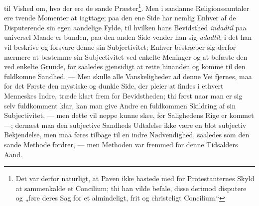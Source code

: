 \documentclass[12pt]{book}
\newcommand{\opage}[1]{\marginnote{\footnotesize\textit{[#1]}}}
\begin{document}
\opage{70} \setcounter{footnote}{0}%
til Vished om, hvo der ere de sande Præster\footnote{Det var derfor
naturligt, at Paven ikke hastede med for Protestanternes Skyld at sammenkalde
et Concilium; thi han vilde befale, disse derimod disputere og „føre deres Sag
for et almindeligt, frit og christeligt Concilium.“}. Men i saadanne
Religionssamtaler ere tvende Momenter at iagttage; paa den ene Side har
nemlig Enhver af de Disputerende sin egen aandelige Fylde, til hvilken hans
Bevidsthed \emph{indadtil} paa universel Maade er bunden, paa den anden Side
vender han sig \emph{udadtil}, i det han vil beskrive og forsvare denne sin
Subjectivitet; Enhver bestræber sig derfor nærmere at bestemme sin
Subjectivitet ved enkelte Meninger og at befæste den ved enkelte Gruude, for
saaledes gjensidigt at rette hinanden og komme til den fuldkomne Sandhed. ---
Men skulle alle Vanskeligheder ad denne Vei fjernes, maa for det Første den
mystiske og dunkle Side, der pleier at findes i ethvert Menneskes Indre,
træde klart frem for Bevidstheden; thi først naar man er sig selv fuldkomment
klar, kan man give Andre en fuldkommen Skildring af sin Subjectivitet, ---
men dette vil neppe kunne skee, før Salighedens Rige er kommet ---; dernæst
maa den subjective Sandheds Udtalelse ikke være en blot subjectiv
Bekjendelse, men maa føres tilbage til en indre Nødvendighed, saaledes som
den sande Methode fordrer, --- men Methoden var fremmed for denne Tidsalders
Aand.
\end{document}
